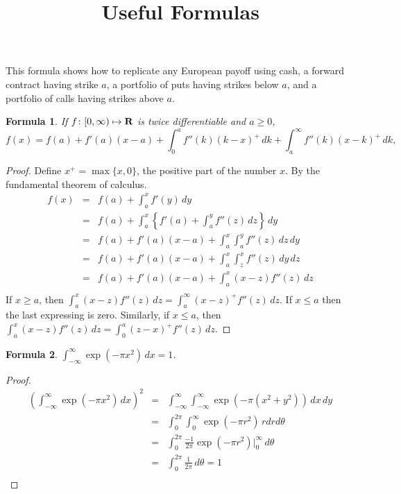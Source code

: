 \documentclass[11pt,fleqn]{amsart}
\newcommand{\R}{{\bf R}}
\newtheorem{formula}{Formula}[section]
\begin{document}
\title{Useful Formulas}
\address{Keith A. Lewis}

\maketitle


This formula shows how to replicate any European payoff using cash, a
forward contract having strike $a$, a portfolio of puts having strikes
below $a$, and a portfolio of calls having strikes above $a$.

\begin{formula}
If $f\colon [0,\infty)\mapsto\R$ is twice differentiable and $a\ge0$,
\begin{equation*}
f(x) = f(a) + f'(a)(x - a)
	+ \int_0^a f''(k) (k - x)^+ \,dk + \int_a^\infty f''(k) (x - k)^+ \,dk,
\end{equation*}
\end{formula}
\begin{proof}
Define $x^+ = \max\{x, 0\}$, the positive part of the number $x$.
By the fundamental theorem of calculus.
\begin{eqnarray*}
f(x) &=& f(a) + \int_a^x f'(y)\,dy\\
 &=& f(a) + \int_a^x \left\{ f'(a) + \int_a^y f''(z)\,dz\right\} \,dy\\
 &=& f(a) + f'(a)(x - a) + \int_a^x \int_a^y f''(z)\,dz \,dy\\
 &=& f(a) + f'(a)(x - a) + \int_a^x \int_z^x f''(z)\,dy \,dz\\
 &=& f(a) + f'(a)(x - a) + \int_a^x (x - z) f''(z) \,dz\\
\end{eqnarray*}
If $x \ge a$, then
$\int_a^x (x - z) f''(z) \,dz = \int_a^\infty (x - z)^+ f''(z) \,dz$. 
If $x \le a$ then the last expressing is zero.
Similarly, if $x \le a$, then $\int_a^x (x - z) f''(z) \,dz
= \int_0^a (z - x)^+ f''(z) \,dz$.
\end{proof}


\begin{formula}
$\displaystyle \int_{-\infty}^\infty \exp(-\pi x^2)\,dx = 1$.
\end{formula}

\begin{proof}
\begin{eqnarray*}
(\int_{-\infty}^\infty \exp(-\pi x^2)\,dx)^2
&=& \int_{-\infty}^\infty\int_{-\infty}^\infty\exp(-\pi(x^2 + y^2))\,dx\,dy\\
&=& \int_0^{2\pi}\int_0^\infty \exp(-\pi r^2)\,r dr d\theta\\
&=& \int_0^{2\pi} \frac{-1}{2\pi}\exp(-\pi r^2)\bigl|_0^\infty\,d\theta\\
&=& \int_0^{2\pi} \frac{1}{2\pi}\,d\theta = 1\\
\end{eqnarray*}
\end{proof}
\end{document}
